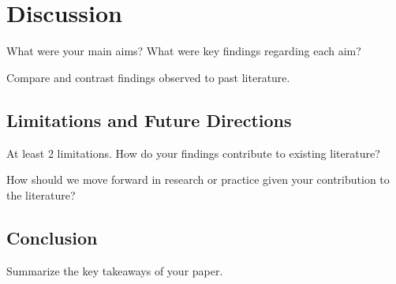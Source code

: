 \section{Discussion}

What were your main aims? What were key findings regarding each aim?

Compare and contrast findings observed to past literature.
\subsection{Limitations and Future Directions}

At least 2 limitations. How do your findings contribute to existing literature? 

How should we move forward in research or practice given your contribution to the literature?

\subsection{Conclusion}

Summarize the key takeaways of your paper.

